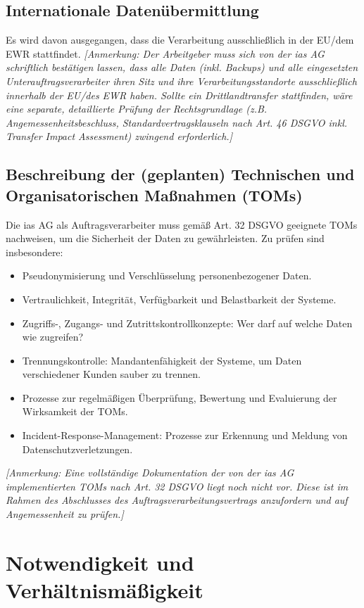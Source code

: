 \documentclass[12pt, a4paper]{article}
\begin{document}
\subsection{Internationale Datenübermittlung}
Es wird davon ausgegangen, dass die Verarbeitung ausschließlich in der EU/dem EWR stattfindet.
\textit{[Anmerkung: Der Arbeitgeber muss sich von der ias AG schriftlich bestätigen lassen, dass alle Daten (inkl. Backups) und alle eingesetzten Unterauftragsverarbeiter ihren Sitz und ihre Verarbeitungsstandorte ausschließlich innerhalb der EU/des EWR haben. Sollte ein Drittlandtransfer stattfinden, wäre eine separate, detaillierte Prüfung der Rechtsgrundlage (z.B. Angemessenheitsbeschluss, Standardvertragsklauseln nach Art. 46 DSGVO inkl. Transfer Impact Assessment) zwingend erforderlich.]}

\subsection{Beschreibung der (geplanten) Technischen und Organisatorischen Maßnahmen (TOMs)}
Die ias AG als Auftragsverarbeiter muss gemäß Art. 32 DSGVO geeignete TOMs nachweisen, um die Sicherheit der Daten zu gewährleisten. Zu prüfen sind insbesondere:
\begin{itemize}
    \item Pseudonymisierung und Verschlüsselung personenbezogener Daten.
    \item Vertraulichkeit, Integrität, Verfügbarkeit und Belastbarkeit der Systeme.
    \item Zugriffs-, Zugangs- und Zutrittskontrollkonzepte: Wer darf auf welche Daten wie zugreifen?
    \item Trennungskontrolle: Mandantenfähigkeit der Systeme, um Daten verschiedener Kunden sauber zu trennen.
    \item Prozesse zur regelmäßigen Überprüfung, Bewertung und Evaluierung der Wirksamkeit der TOMs.
    \item Incident-Response-Management: Prozesse zur Erkennung und Meldung von Datenschutzverletzungen.
\end{itemize}
\textit{[Anmerkung: Eine vollständige Dokumentation der von der ias AG implementierten TOMs nach Art. 32 DSGVO liegt noch nicht vor. Diese ist im Rahmen des Abschlusses des Auftragsverarbeitungsvertrags anzufordern und auf Angemessenheit zu prüfen.]}


\section{Notwendigkeit und Verhältnismäßigkeit}
\end{document}
